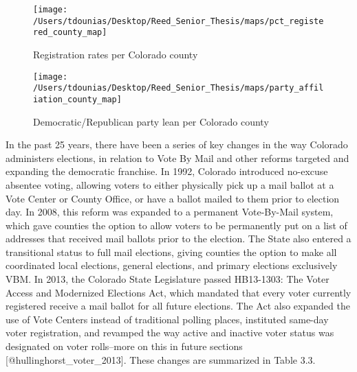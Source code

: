 \documentclass[]{article}
\begin{document}
\begin{figure}

{\centering \texttt{[image: /Users/tdounias/Desktop/Reed\_Senior\_Thesis/maps/pct\_registered\_county\_map]} 

}

\caption{Registration rates per Colorado county}\label{fig:reg per county map}
\end{figure}

\begin{figure}

{\centering \texttt{[image: /Users/tdounias/Desktop/Reed\_Senior\_Thesis/maps/party\_affiliation\_county\_map]} 

}

\caption{Democratic/Republican party lean per Colorado county}\label{fig:party reg per county map}
\end{figure}

In the past 25 years, there have been a series of key changes in the way
Colorado administers elections, in relation to Vote By Mail and other
reforms targeted and expanding the democratic franchise. In 1992,
Colorado introduced no-excuse absentee voting, allowing voters to either
physically pick up a mail ballot at a Vote Center or County Office, or
have a ballot mailed to them prior to election day. In 2008, this reform
was expanded to a permanent Vote-By-Mail system, which gave counties the
option to allow voters to be permanently put on a list of addresses that
received mail ballots prior to the election. The State also entered a
transitional status to full mail elections, giving counties the option
to make all coordinated local elections, general elections, and primary
elections exclusively VBM. In 2013, the Colorado State Legislature
passed HB13-1303: The Voter Access and Modernized Elections Act, which
mandated that every voter currently registered receive a mail ballot for
all future elections. The Act also expanded the use of Vote Centers
instead of traditional polling places, instituted same-day voter
registration, and revamped the way active and inactive voter status was
designated on voter rolls--more on this in future sections
{[}@hullinghorst\_voter\_2013{]}. These changes are summarized in Table
3.3.
\end{document}
